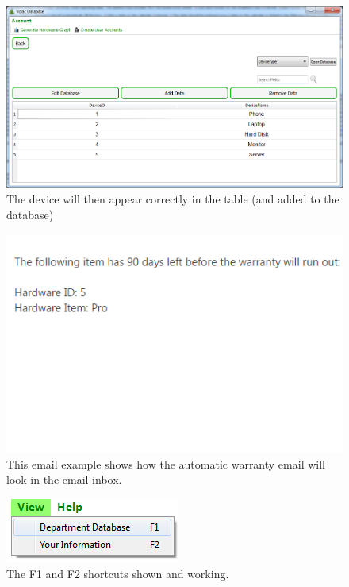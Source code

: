 \begin{figure}[H]
    \includegraphics[width=\textwidth]{./Testing/Images/AddedDevice.png}
    \caption{The device will then appear correctly in the table (and added to the database)} \label{fig:AddedDevice}
\end{figure}


\begin{figure}[H]
    \includegraphics[width=\textwidth]{./Testing/Images/EmailExpiredHardware.png}
    \caption{This email example shows how the automatic warranty email will look in the email inbox.} \label{fig:EmailExpiredHardware}
\end{figure}


\begin{figure}[H]
    \includegraphics[width=\textwidth]{./Testing/Images/DepartmentInformationButton.png}
    \caption{The F1 and F2 shortcuts shown and working.} \label{fig:DepartmentInformationButton}
\end{figure}

